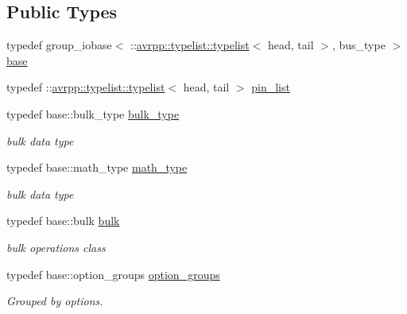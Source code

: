 \subsection*{Public Types}
\begin{DoxyCompactItemize}
\item 
typedef group\_\-iobase$<$ ::\hyperlink{structavrpp_1_1typelist_1_1typelist}{avrpp::typelist::typelist}$<$ head, tail $>$, bus\_\-type $>$ \hyperlink{structavrpp_1_1bus_1_1group__output_3_01_1_1avrpp_1_1typelist_1_1typelist_3_01head_00_01tail_01_4_00_01bus__type_01_4_a4c3ea4f3290eb5dc3b45e83634820404}{base}
\item 
typedef ::\hyperlink{structavrpp_1_1typelist_1_1typelist}{avrpp::typelist::typelist}$<$ head, tail $>$ \hyperlink{structavrpp_1_1bus_1_1group__output_3_01_1_1avrpp_1_1typelist_1_1typelist_3_01head_00_01tail_01_4_00_01bus__type_01_4_a8f38159613b1738f164276c3f028f87c}{pin\_\-list}
\item 
typedef base::bulk\_\-type \hyperlink{structavrpp_1_1bus_1_1group__output_3_01_1_1avrpp_1_1typelist_1_1typelist_3_01head_00_01tail_01_4_00_01bus__type_01_4_ac7b77056128a6aca8a53b79e95feaaed}{bulk\_\-type}
\begin{DoxyCompactList}\small\item\em bulk data type \item\end{DoxyCompactList}\item 
typedef base::math\_\-type \hyperlink{structavrpp_1_1bus_1_1group__output_3_01_1_1avrpp_1_1typelist_1_1typelist_3_01head_00_01tail_01_4_00_01bus__type_01_4_a00f5369cee28e57effbee4aafabd0d47}{math\_\-type}
\begin{DoxyCompactList}\small\item\em bulk data type \item\end{DoxyCompactList}\item 
typedef base::bulk \hyperlink{structavrpp_1_1bus_1_1group__output_3_01_1_1avrpp_1_1typelist_1_1typelist_3_01head_00_01tail_01_4_00_01bus__type_01_4_ad2d880eba1fe7e186d50827f72aaefae}{bulk}
\begin{DoxyCompactList}\small\item\em bulk operations class \item\end{DoxyCompactList}\item 
typedef base::option\_\-groups \hyperlink{structavrpp_1_1bus_1_1group__output_3_01_1_1avrpp_1_1typelist_1_1typelist_3_01head_00_01tail_01_4_00_01bus__type_01_4_acde54fbde4fa72d86cdd16a22955be53}{option\_\-groups}
\begin{DoxyCompactList}\small\item\em Grouped by options. \item\end{DoxyCompactList}\end{DoxyCompactItemize}
